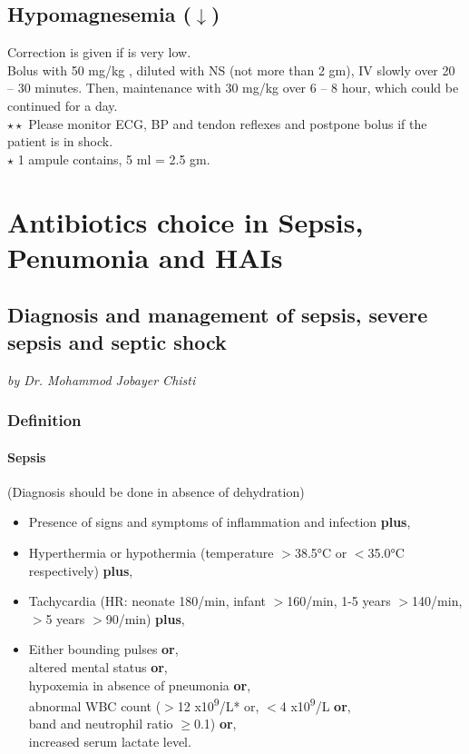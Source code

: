 \documentclass[11pt,a4paper]{report}
\begin{document}
\section[Hypomagnesemia]{Hypomagnesemia ({\color{blue}$\downarrow$})}
Correction is given if  is very low. \\
Bolus with 50 mg/kg , diluted with NS (not more than 2 gm), IV slowly over 20 -- 30 minutes. Then, maintenance with 30 mg/kg  over 6 -- 8 hour, which could be continued for a day. \\
{\color{red}$\star\star$} Please monitor ECG, BP and tendon reflexes and postpone bolus if the patient is in shock.\\
{\color{red}$\star$} 1 ampule contains, 5 ml = 2.5 gm.



\chapter[Choice of Antibiotics]{Antibiotics choice in Sepsis, Penumonia and HAIs}


\section[Sepsis, Severe Sepsis \& Septic Shock]{Diagnosis and management of sepsis, severe sepsis and septic shock}
\textit{by Dr. Mohammod Jobayer Chisti}
\subsection{Definition}
\subsubsection{Sepsis}
(Diagnosis should be done in absence of dehydration)
\begin{itemize}
	\item Presence of signs and symptoms of inflammation and infection \textbf{plus},
	\item Hyperthermia or hypothermia (temperature $>$38.5\si{\celsius} or $<$35.0\si{\celsius} respectively) \textbf{plus}, 
	\item Tachycardia (HR: neonate 180/min, infant $>$160/min, 1-5 years $>$140/min, $>$5 years $>$90/min) \textbf{plus},
	\item Either bounding pulses \textbf{or}, \\
	altered mental status \textbf{or}, \\
	hypoxemia in absence of pneumonia \textbf{or}, \\
	abnormal WBC count ($>$12 x10\textsuperscript{9}/L* or, $<$4 x10\textsuperscript{9}/L \textbf{or}, \\
	band and neutrophil ratio $\geq$0.1) \textbf{or}, \\
	increased serum lactate level. 
\end{itemize}
\end{document}
